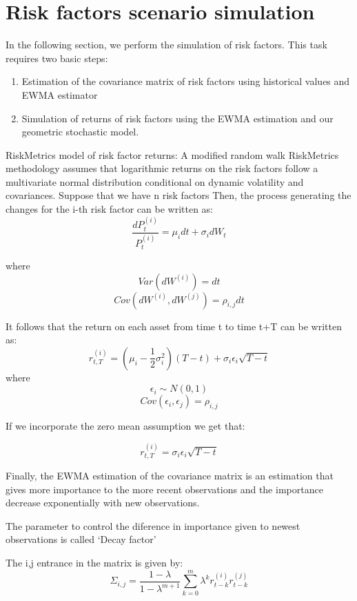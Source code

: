 \documentclass[letterpaper,10pt,english]{/anaconda/lib/python2.7/site-packages/sphinx/texinputs/sphinxhowto}
\newenvironment{ColorVerbatim}
        {\begin{mdframed}[%
            roundcorner=1.0pt, %
            backgroundcolor=nbframe-bg, %
            userdefinedwidth=1\linewidth, %
            leftmargin=0.1\linewidth, %
            innerleftmargin=0pt, %
            innerrightmargin=0pt, %
            linecolor=nbframe-border, %
            linewidth=1pt, %
            usetwoside=false, %
            everyline=true, %
            innerlinewidth=3pt, %
            innerlinecolor=nbframe-bg, %
            middlelinewidth=1pt, %
            middlelinecolor=nbframe-bg, %
            outerlinewidth=0.5pt, %
            outerlinecolor=nbframe-border, %
            needspace=0pt
        ]}
        {\end{mdframed}}
\begin{document}
\begin{ColorVerbatim}
            
                \vspace{-0.2\baselineskip}
            
        \end{ColorVerbatim}
    
\part{Risk factors scenario simulation}In the following section, we perform the simulation of risk factors.
This task requires two basic steps:

\begin{enumerate}
\def\labelenumi{\arabic{enumi}.}
\itemsep1pt\parskip0pt
\item
  Estimation of the covariance matrix of risk factors using historical
  values and EWMA estimator
\item
  Simulation of returns of risk factors using the EWMA estimation and
  our geometric stochastic model.
\end{enumerate}RiskMetrics model of risk factor returns: A modified random walk
RiskMetrics methodology assumes that logarithmic returns on the risk
factors follow a multivariate normal distribution conditional on dynamic
volatility and covariances. Suppose that we have n risk factors Then,
the process generating the changes for the i-th risk factor can be
written as:
\[ \frac{dP_t^{(i)}}{P_t^{(i)}} = \mu_i dt + \sigma_i d W_t\]

where \[Var(dW^{(i)})=dt\] \[Cov(dW^{(i)},dW^{(j)})=\rho_{i,j}dt\]

It follows that the return on each asset from time t to time t+T can be
written as:
\[r_{t,T}^{(i)}=(\mu_i-\frac{1}{2}\sigma_i^2)(T-t)+\sigma_i\epsilon_i\sqrt{T-t}\]
where \[\epsilon_i \sim N(0,1)\]
\[ Cov(\epsilon_i,\epsilon_j)=\rho_{i,j} \]

If we incorporate the zero mean assumption we get that:

\[ r_{t,T}^{(i)} = \sigma_i \epsilon_i \sqrt{T-t} \]

Finally, the EWMA estimation of the covariance matrix is an estimation
that gives more importance to the more recent observations and the
importance decrease exponentially with new observations.

The parameter to control the diference in importance given to newest
observations is called `Decay factor'

The i,j entrance in the matrix is given by:
\[ \Sigma_{i,j} = \frac{1-\lambda}{1-\lambda^{m+1}}\sum\limits_{k=0}^{m} \lambda^k r_{t-k}^{(i)} r_{t-k}^{(j)} \]
\end{document}
